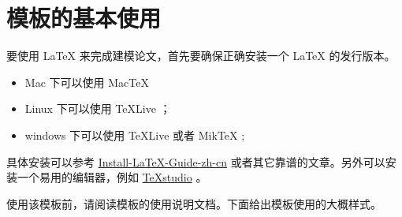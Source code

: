 
\section{模板的基本使用}

要使用 \LaTeX{} 来完成建模论文，首先要确保正确安装一个 \LaTeX{} 的发行版本。

\begin{itemize}
    \item Mac 下可以使用 Mac\TeX{}
    \item Linux 下可以使用 \TeX{}Live ；
    \item windows 下可以使用 \TeX{}Live 或者 Mik\TeX{} ;
\end{itemize}

具体安装可以参考 \href{https://github.com/OsbertWang/install-latex-guide-zh-cn/releases/}{Install-LaTeX-Guide-zh-cn} 或者其它靠谱的文章。另外可以安装一个易用的编辑器，例如 \href{https://mirrors.tuna.tsinghua.edu.cn/github-release/texstudio-org/texstudio/LatestRelease/}{\TeX{}studio} 。

使用该模板前，请阅读模板的使用说明文档。下面给出模板使用的大概样式。

